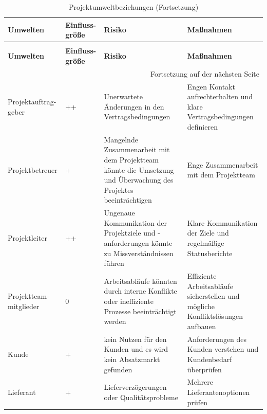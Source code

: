 \begin{longtable}{p{} | p{} | p{} | p{}}
	\caption{Projektumweltbeziehungen}
	\label{tab:umweltbeziehungen}
	\\ \toprule
	\textbf{Umwelten} & \textbf{Einfluss-größe} & \textbf{Risiko} & \textbf{Maßnahmen}
	\\ \midrule
	\endfirsthead
	\caption{Projektumweltbeziehungen (Fortsetzung)}
	\\ \toprule
	\textbf{Umwelten} & \textbf{Einfluss-größe} & \textbf{Risiko} & \textbf{Maßnahmen}
	\\ \midrule
	\endhead
	\midrule
	\multicolumn{4}{r}{{Fortsetzung auf der nächsten Seite}} 
	\\ \bottomrule
	\endfoot
	\bottomrule
	\endlastfoot
	Projektauftrag-geber & ++ & Unerwartete Änderungen in den Vertragsbedingungen & Engen Kontakt aufrechterhalten und klare Vertragsbedingungen definieren \\
	\midrule
	Projektbetreuer & + & Mangelnde Zusammenarbeit mit dem Projektteam könnte die Umsetzung und Überwachung des Projektes beeinträchtigen & Enge Zusammenarbeit mit dem Projektteam \\
	Projektleiter & ++ & Ungenaue Kommunikation der Projektziele und -anforderungen könnte zu Missverständnissen führen & Klare Kommunikation der Ziele und regelmäßige Statusberichte \\
	\midrule
	Projektteam-mitglieder & 0 & Arbeitsabläufe könnten durch interne Konflikte oder ineffiziente Prozesse beeinträchtigt werden & Effiziente Arbeitsabläufe sicherstellen und mögliche Konfliktslösungen aufbauen \\
	\midrule
	Kunde & + & kein Nutzen für den Kunden und es wird  kein Absatzmarkt gefunden & Anforderungen des Kunden verstehen und Kundenbedarf überprüfen \\
	\midrule
	Lieferant & + & Lieferverzögerungen oder Qualitätsprobleme & Mehrere Lieferantenoptionen prüfen \\
\end{longtable}
